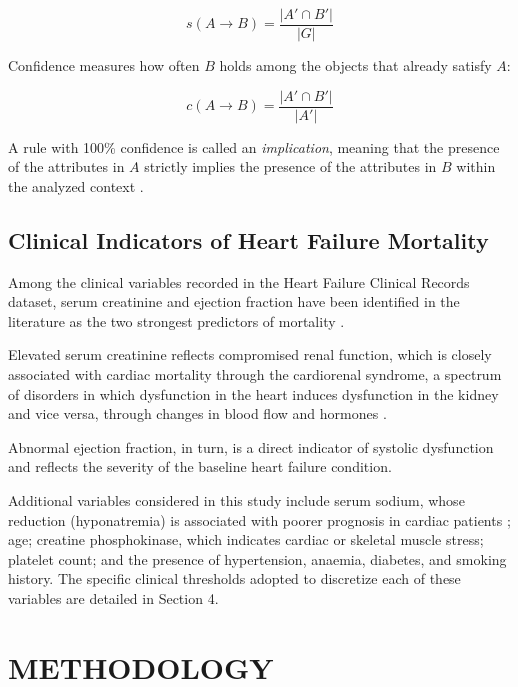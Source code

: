 \documentclass[a4paper,twoside]{article}
\begin{document}
\begin{equation}
s(A \rightarrow B) = \frac{|A' \cap B'|}{|G|}
\end{equation}

Confidence measures how often $B$ holds among the objects that already satisfy $A$:

\begin{equation}
c(A \rightarrow B) = \frac{|A' \cap B'|}{|A'|}
\end{equation}

A rule with 100\% confidence is called an \emph{implication}, meaning that the presence of the attributes in $A$ strictly implies the presence of the attributes in $B$ within the analyzed context \cite{GanterWille1999,Ananias2021}.

\subsection{Clinical Indicators of Heart Failure Mortality}

Among the clinical variables recorded in the Heart Failure Clinical Records dataset, serum creatinine and ejection fraction have been identified in the literature as the two strongest predictors of mortality \cite{Ahmad2017,ChiccoJurman2020}.

Elevated serum creatinine reflects compromised renal function, which is closely associated with cardiac mortality through the cardiorenal syndrome, a spectrum of disorders in which dysfunction in the heart induces dysfunction in the kidney and vice versa, through changes in blood flow and hormones \cite{Rangaswami2019}.

Abnormal ejection fraction, in turn, is a direct indicator of systolic dysfunction and reflects the severity of the baseline heart failure condition.

Additional variables considered in this study include serum sodium, whose reduction (hyponatremia) is associated with poorer prognosis in cardiac patients \cite{Zhao2023}; age; creatine phosphokinase, which indicates cardiac or skeletal muscle stress; platelet count; and the presence of hypertension, anaemia, diabetes, and smoking history. The specific clinical thresholds adopted to discretize each of these variables are detailed in Section 4.

\section{\uppercase{Methodology}}
\label{sec:methodology}
\end{document}
